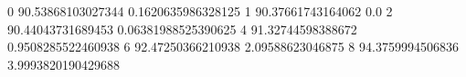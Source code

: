 0 90.53868103027344 0.1620635986328125
1 90.37661743164062 0.0
2 90.44043731689453 0.06381988525390625
4 91.32744598388672 0.9508285522460938
6 92.47250366210938 2.09588623046875
8 94.3759994506836 3.9993820190429688
